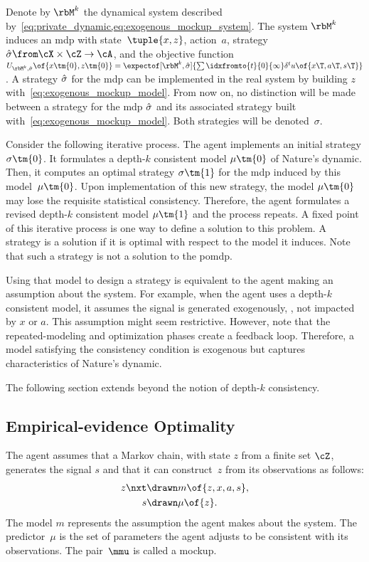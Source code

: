 Denote by \(\rbM\K\) the dynamical system described by~\cref{eq:private_dynamic,eq:exogenous_mockup_system}.
The system \(\rbM\K\) induces an \ac{mdp} with state~\(\tuple{x, z}\), action~\(a\), strategy~\(\sigmahat \from \cX \times \cZ \to \cA\), and the objective function~\(U\params{\rbM\K, \sigmahat}\of{x\tm{0}, z\tm{0}} = \expectof[\rbM\K, \sigmahat]{\sum\idxfromto{t}{0}{\infty} \delta^t u \of{x\T, a\T, s\T}}\).
A strategy \(\hat{\sigma}\) for the \ac{mdp} can be implemented in the real system by building \(z\) with~\cref{eq:exogenous_mockup_model}.
From now on, no distinction will be made between a strategy for the \ac{mdp} \(\hat{\sigma}\) and its associated strategy built with~\cref{eq:exogenous_mockup_model}.
Both strategies will be denoted~\(\sigma\).

Consider the following iterative process.
The agent implements an initial strategy \(\sigma\tm{0}\).
It formulates a depth-\(k\) consistent model \(\mu\tm{0}\) of Nature's dynamic.
Then, it computes an optimal strategy \(\sigma\tm{1}\) for the \ac{mdp} induced by this model~\(\mu\tm{0}\).
Upon implementation of this new strategy, the model \(\mu\tm{0}\) may lose the requisite statistical consistency.
Therefore, the agent formulates a revised depth-\(k\) consistent model \(\mu\tm{1}\) and the process repeats.
A fixed point of this iterative process is one way to define a solution to this problem.
A strategy is a solution if it is optimal with respect to the model it induces.
Note that such a strategy is not a solution to the \ac{pomdp}.

Using that model to design a strategy is equivalent to the agent making an assumption about the system.
For example, when the agent uses a depth-\(k\) consistent model, it assumes the signal is generated exogenously, \ie, not impacted by \(x\) or \(a\).
This assumption might seem restrictive.
However, note that the repeated-modeling and optimization phases create a feedback loop.
Therefore, a model satisfying the consistency condition is exogenous but captures characteristics of Nature's dynamic.

The following section extends beyond the notion of depth-\(k\) consistency.

\subsection{Empirical-evidence Optimality}
\label{sec:empirical_evidence_optimality}

The agent assumes that a Markov chain, with state \(z\) from a finite set \(\cZ\), generates the signal \(s\) and that it can construct~\(z\) from its observations as follows:
\begin{subequations}
\label{eq:mockup_system}
\begin{align}
\label{eq:mockup_model}
z\nxt &\drawn m \of{z, x, a, s}, \\
\label{eq:mockup_predictor}
s &\drawn \mu \of{z}.
\end{align}
\end{subequations}
The model \(m\) represents the assumption the agent makes about the system.
The predictor~\(\mu\) is the set of parameters the agent adjusts to be consistent with its observations.
The pair~\(\mmu\) is called a mockup.

